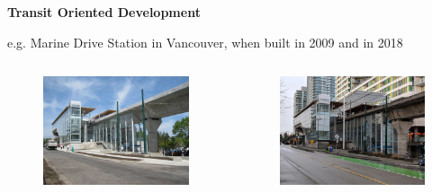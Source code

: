 \documentclass[aspectratio=169]{beamer}
\begin{document}
\begin{frame}
	
	\textbf{Transit Oriented Development}
	
	e.g. Marine Drive Station in Vancouver, when built in 2009 and in 2018
	
	\begin{columns}
		\begin{column}{0.5\textwidth}
			
			
			\begin{figure}
				\centering
				\includegraphics[width=1\linewidth]{images/marine_2009.jpg}
			\end{figure}
			
			
		\end{column}
		
		\begin{column}{0.5\textwidth}
			
			\begin{figure}
				\centering
			\includegraphics[width=1\linewidth]{images/marine_2018.jpg}
			\end{figure}
			

\end{column}
\end{columns}
\end{frame}
\end{document}
